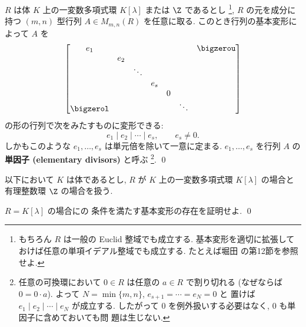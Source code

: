 \documentclass[12pt,twoside]{jarticle}
\begin{document}
\begin{theorem}[単因子]
\label{theorem:elementary-divisor}
  $R$ は体 $K$ 上の一変数多項式環 $K[\lambda]$ または $\Z$ であるとし%
  \footnote{もちろん $R$ は一般の Euclid 整域でも成立する.
    基本変形を適切に拡張しておけば任意の単項イデアル整域でも成立する.
    たとえば堀田 \cite{gun-kagun} の第12節を参照せよ.}, 
  $R$ の元を成分に持つ $(m,n)$ 型行列 $A\in M_{m,n}(R)$ を任意に取る. 
  このとき行列の基本変形によって $A$ を
  \begin{equation*}
    \begin{bmatrix}
      e_1 &     &        &     &   & & \bigzerou \\
          & e_2 &        &     &   & & \\
          &     & \ddots &     &   & & \\
          &     &        & e_s &   & & \\
          &     &        &     & 0 & & \\
      \bigzerol & &      &     &   & \ddots & \\
    \end{bmatrix}
  \end{equation*}
  の形の行列で次をみたすものに変形できる:
  \begin{equation*}
    e_1\mid e_2\mid\cdots\mid e_s, \qquad e_s\ne 0.
  \end{equation*}
  しかもこのような $e_1,\dots,e_s$ は単元倍を除いて一意に定まる.  
  $e_1,\dots,e_s$ を行列 $A$ の{\bf 単因子 (elementary divisors)} と呼ぶ%
  \footnote{任意の可換環において $0\in R$ は任意の $a\in R$ で割り切れる
    (なぜならば $0=0\cdot a$).
    よって $N=\min\{m,n\}$, $e_{s+1}=\cdots=e_N=0$ と
    置けば $e_1\mid e_2\mid\cdots\mid e_N$ が成立する.
    したがって $0$ を例外扱いする必要はなく, $0$ も単因子に含めておいても問
    題は生じない.}. 
  \qed
\end{theorem}

以下において $K$ は体であるとし, $R$ が $K$ 上の一変数多項式環 $K[\lambda]$
の場合と有理整数環 $\Z$ の場合を扱う.


\begin{question}
\label{q:exists-elementary-divisor}
  $R=K[\lambda]$ の場合にの
  条件を満たす基本変形の存在を証明せよ. \qed
\end{question}
\end{document}
